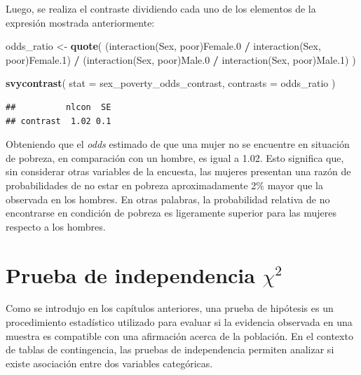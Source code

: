 \documentclass[
  spanish,
  12pt,
]{book}
\newenvironment{Shaded}{\begin{snugshade}}{\end{snugshade}}
\newcommand{\AttributeTok}[1]{\textcolor[rgb]{0.13,0.29,0.53}{#1}}
\newcommand{\FunctionTok}[1]{\textcolor[rgb]{0.13,0.29,0.53}{\textbf{#1}}}
\newcommand{\NormalTok}[1]{#1}
\newcommand{\OtherTok}[1]{\textcolor[rgb]{0.56,0.35,0.01}{#1}}
\newcommand{\SpecialCharTok}[1]{\textcolor[rgb]{0.81,0.36,0.00}{\textbf{#1}}}
\newcommand{\StringTok}[1]{\textcolor[rgb]{0.31,0.60,0.02}{#1}}
\begin{document}
Luego, se realiza el contraste dividiendo cada uno de los elementos de la expresión mostrada anteriormente:

\begin{Shaded}
\begin{Highlighting}[]
\NormalTok{odds\_ratio }\OtherTok{\textless{}{-}} \FunctionTok{quote}\NormalTok{(}
\NormalTok{ (}\StringTok{\textasciigrave{}}\AttributeTok{interaction(Sex, poor)Female.0}\StringTok{\textasciigrave{}} \SpecialCharTok{/}
  \StringTok{\textasciigrave{}}\AttributeTok{interaction(Sex, poor)Female.1}\StringTok{\textasciigrave{}}\NormalTok{) }\SpecialCharTok{/}
\NormalTok{ (}\StringTok{\textasciigrave{}}\AttributeTok{interaction(Sex, poor)Male.0}\StringTok{\textasciigrave{}} \SpecialCharTok{/}
  \StringTok{\textasciigrave{}}\AttributeTok{interaction(Sex, poor)Male.1}\StringTok{\textasciigrave{}}\NormalTok{)}
\NormalTok{)}

\FunctionTok{svycontrast}\NormalTok{(}
  \AttributeTok{stat =}\NormalTok{ sex\_poverty\_odds\_contrast,}
  \AttributeTok{contrasts =}\NormalTok{ odds\_ratio}
\NormalTok{)}
\end{Highlighting}
\end{Shaded}

\begin{verbatim}
##          nlcon  SE
## contrast  1.02 0.1
\end{verbatim}

Obteniendo que el \emph{odds} estimado de que una mujer no se encuentre en situación de pobreza, en comparación con un hombre, es igual a 1.02. Esto significa que, sin considerar otras variables de la encuesta, las mujeres presentan una razón de probabilidades de no estar en pobreza aproximadamente 2\% mayor que la observada en los hombres. En otras palabras, la probabilidad relativa de no encontrarse en condición de pobreza es ligeramente superior para las mujeres respecto a los hombres.

\section{\texorpdfstring{Prueba de independencia \(\chi^{2}\)}{Prueba de independencia \textbackslash chi\^{}\{2\}}}\label{prueba-de-independencia-chi}

Como se introdujo en los capítulos anteriores, una prueba de hipótesis es un procedimiento estadístico utilizado para evaluar si la evidencia observada en una muestra es compatible con una afirmación acerca de la población. En el contexto de tablas de contingencia, las pruebas de independencia permiten analizar si existe asociación entre dos variables categóricas.
\end{document}
